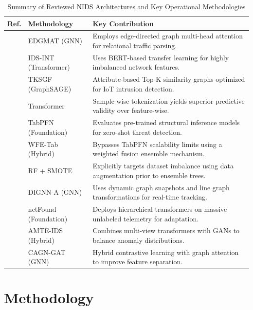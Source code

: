 \documentclass[sn-basic,oneside]{sn-jnl}
\theoremstyle{thmstyleone}%
\theoremstyle{thmstyletwo}%
\theoremstyle{thmstylethree}%
\begin{document}
\begin{table}[h]
\caption{Summary of Reviewed NIDS Architectures and Key Operational Methodologies}\label{tab:lit_review}
\begin{tabular}{@{}p{3.5cm}p{3cm}p{7cm}@{}}
\toprule
\textbf{Ref.} & \textbf{Methodology} & \textbf{Key Contribution} \\
\midrule
\citet{li2023network} & EDGMAT (GNN) & Employs edge-directed graph multi-head attention for relational traffic parsing.\\
\citet{ullah2024ids} & IDS-INT (Transformer) & Uses BERT-based transfer learning for highly imbalanced network features.\\
\citet{ngo2025optimizing} & TKSGF (GraphSAGE) & Attribute-based Top-K similarity graphs optimized for IoT intrusion detection.\\
\citet{aksholak2026transformer} & Transformer & Sample-wise tokenization yields superior predictive validity over feature-wise.\\
\citet{garcia2025foundation} & TabPFN (Foundation) & Evaluates pre-trained structural inference models for zero-shot threat detection.\\
\citet{ruiz2025wfe} & WFE-Tab (Hybrid) & Bypasses TabPFN scalability limits using a weighted fusion ensemble mechanism.\\
\citet{saputra2025enhancing} & RF + SMOTE & Explicitly targets dataset imbalance using data augmentation prior to ensemble trees.\\
\citet{liu2025dignn} & DIGNN-A (GNN) & Uses dynamic graph snapshots and line graph transformations for real-time tracking.\\
\citet{guthula2025netfound} & netFound (Foundation) & Deploys hierarchical transformers on massive unlabeled telemetry for adaptation.\\
\citet{hasan2026adaptive} & AMTE-IDS (Hybrid) & Combines multi-view transformers with GANs to balance anomaly distributions.\\
\citet{jahin2025cagn} & CAGN-GAT (GNN) & Hybrid contrastive learning with graph attention to improve feature separation.\\
\bottomrule
\end{tabular}
\end{table}

\section{Methodology}\label{sec3}
\end{document}
